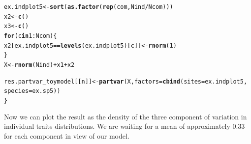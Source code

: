 \documentclass[12pt]{article}\usepackage[]{graphicx}\usepackage[]{color}
\makeatletter
\newcommand{\hlnum}[1]{\textcolor[rgb]{0.686,0.059,0.569}{#1}}%
\newcommand{\hlopt}[1]{\textcolor[rgb]{0,0,0}{#1}}%
\newcommand{\hlstd}[1]{\textcolor[rgb]{0.345,0.345,0.345}{#1}}%
\newcommand{\hlkwa}[1]{\textcolor[rgb]{0.161,0.373,0.58}{\textbf{#1}}}%
\newcommand{\hlkwb}[1]{\textcolor[rgb]{0.69,0.353,0.396}{#1}}%
\newcommand{\hlkwc}[1]{\textcolor[rgb]{0.333,0.667,0.333}{#1}}%
\newcommand{\hlkwd}[1]{\textcolor[rgb]{0.737,0.353,0.396}{\textbf{#1}}}%
\newenvironment{kframe}{%
 \def\at@end@of@kframe{}%
 \ifinner\ifhmode%
  \def\at@end@of@kframe{\end{minipage}}%
  \begin{minipage}{\columnwidth}%
 \fi\fi%
 \def\FrameCommand##1{\hskip\@totalleftmargin \hskip-\fboxsep
 \colorbox{shadecolor}{##1}\hskip-\fboxsep
     \hskip-\linewidth \hskip-\@totalleftmargin \hskip\columnwidth}%
 \MakeFramed {\advance\hsize-\width
   \@totalleftmargin\z@ \linewidth\hsize
   \@setminipage}}%
 {\par\unskip\endMakeFramed%
 \at@end@of@kframe}
\newenvironment{knitrout}{}{} %
\makeatother
\begin{document}
\begin{knitrout}
\begin{kframe}
\begin{alltt}
 \hlstd{ex.indplot5} \hlkwb{<-} \hlkwd{sort}\hlstd{(}\hlkwd{as.factor}\hlstd{(}\hlkwd{rep}\hlstd{(com, Nind}\hlopt{/}\hlstd{Ncom)))}
 \hlstd{x2} \hlkwb{<-} \hlkwd{c}\hlstd{()}
 \hlstd{x3} \hlkwb{<-} \hlkwd{c}\hlstd{()}
 \hlkwa{for}\hlstd{(c} \hlkwa{in} \hlnum{1}\hlopt{:}\hlstd{Ncom)\{}
 \hlstd{x2[ex.indplot5} \hlopt{==} \hlkwd{levels}\hlstd{(ex.indplot5 )[c]]} \hlkwb{<-} \hlkwd{rnorm}\hlstd{(}\hlnum{1}\hlstd{)}
 \hlstd{\}}
 \hlstd{X} \hlkwb{<-} \hlkwd{rnorm}\hlstd{(Nind)} \hlopt{+} \hlstd{x1} \hlopt{+} \hlstd{x2}

 \hlstd{res.partvar_toymodel[[n]]} \hlkwb{<-} \hlkwd{partvar}\hlstd{(X,} \hlkwc{factors} \hlstd{=} \hlkwd{cbind}\hlstd{(}\hlkwc{sites} \hlstd{= ex.indplot5,}
               \hlkwc{species} \hlstd{= ex.sp5))}
\hlstd{\}}
\end{alltt}
\end{kframe}
\end{knitrout}

Now we can plot the result as the density of the three component of variation in individual traits distributions. 
We are waiting for a mean of approximately 0.33 for each component in view of our model.
\end{document}
